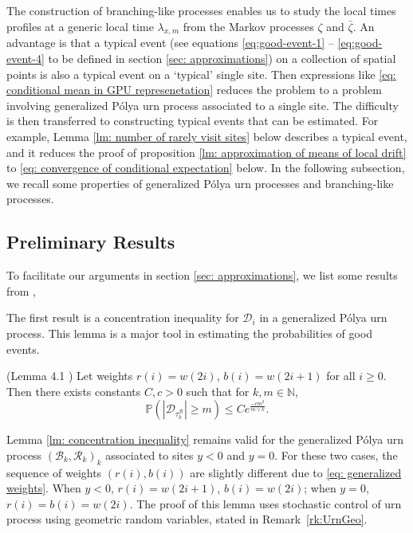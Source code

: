 \documentclass[EJP]{ejpecp} %
\newcommand{\abs}[1]{\left\vert #1 \right\vert}
\begin{document}
The construction of branching-like processes enables us to study the local times profiles at a generic local time $\lambda_{x,m}$ from the Markov processes $\zeta$ and $\bar{\zeta}$. An advantage is that a typical event ({see equations \eqref{eq:good-event-1} -- \eqref{eq:good-event-4} to be defined in section \ref{sec: approximations}}) on a collection of spatial points is also a typical event on a `typical' single site. Then expressions like \eqref{eq: conditional mean in GPU represenetation} reduces the problem to a problem involving generalized P\'{o}lya urn process associated to a single site. The difficulty is then transferred to constructing typical events that can be estimated. For example, Lemma \ref{lm: number of rarely visit sites} below describes a typical event, and it reduces the proof of proposition \ref{lm: approximation of means of local drift} to \eqref{eq: convergence of conditional expectation} below. In the following subsection, we recall some properties of generalized P\'{o}lya urn processes and branching-like processes.

\subsection{Preliminary Results}
To facilitate our arguments in section \ref{sec: approximations}, we list some results from \cite{KMP23,T96}, 

The first result is a concentration inequality for $\mathscr{D}_i$ in a generalized P\'{o}lya urn process. This lemma is a major tool in estimating the probabilities of good events.
\begin{lemma}(Lemma 4.1 \cite{KMP23})\label{lm: concentration inequality}
	Let weights $r(i) = w(2i)$, $b(i)= w(2i+1) $ for all $i\geq 0$. Then there exists constants $C,c>0$ such that for $k, m \in \mathbb{N}$,
	\[
	\mathbb{P}\left(  \abs{ \mathscr{D}_{\tau_k^{\mathscr{B}}}   } \geq m \right) \leq C e^{\frac{-cm^2}{m \vee k}}.
	\]
\end{lemma} 
Lemma \ref{lm: concentration inequality} remains valid for the generalized P\'{o}lya urn process $(\mathscr{B}_{k},\mathscr{R}_{k})_k$ associated to sites $y<0$ and $y=0$. For these two cases, the sequence of weights $(r(i),b(i))$ are slightly different due to \eqref{eq: generalized weights}. When $y<0$, $r(i) = w(2i+1)$, $b(i)= w(2i) $; when $y=0$, $r(i) = b(i)=w(2i)$. The proof of this lemma uses stochastic control of urn process using geometric random variables, stated in Remark~\ref{rk:UrnGeo}.
\end{document}

